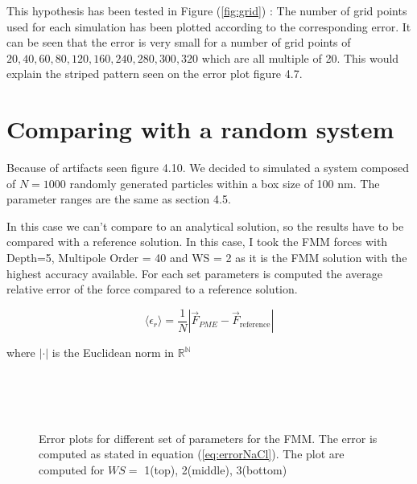 \documentclass[11pt,twoside,a4paper]{report}
\begin{document}
   This hypothesis has been tested in Figure (\ref{fig:grid}) : The number of grid points used for each simulation has been plotted according to the corresponding error. It can be seen that the error is very small for a number of grid points of $20,40,60,80,120,160,240,280,300,320$ which are all multiple of 20. This would explain the striped pattern seen on the error plot figure 4.7.


\section{Comparing with a random system}

	Because of artifacts seen figure 4.10. We decided to simulated a system composed of $N=1000$ randomly generated particles within a box size of 100 nm. The parameter ranges are the same as section 4.5.

	In this case we can't compare to an analytical solution, so the results have to be compared with a reference solution. In this case, I took the FMM forces with Depth=5, Multipole Order = 40 and WS = 2 as it is the FMM solution with the highest accuracy available. For each set parameters is computed the average relative error of the force compared to a reference solution.
	
	\begin{equation}
	 \langle \epsilon_r \rangle	= \frac{1}{N}| \vec{F}_{PME} - \vec{F}_{\text{reference}} |
	\end{equation}		
	
	where $|\cdot|$ is the Euclidean norm in $\mathbb{R^N}$

		    \begin{figure}[H]
  \label{fig:FMM_contour}
    \centering  
 \\    
  \\   
\\    
  
  
    \caption{Error plots for different set of parameters for the FMM. The error is computed as stated in equation (\ref{eq:errorNaCl}). The plot are computed for $WS =$ 1(top), 2(middle), 3(bottom)}    
   \end{figure}  
\end{document}
